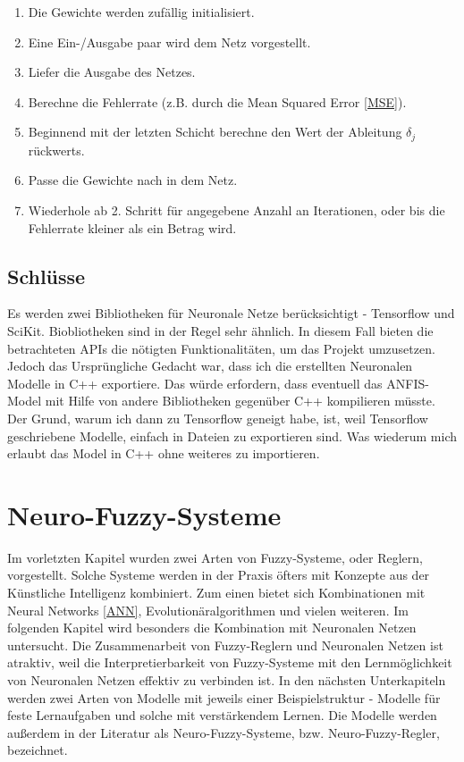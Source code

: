 \begin{enumerate}\label{BPA}
	\item Die Gewichte werden zufällig initialisiert.
	\item Eine Ein-/Ausgabe paar wird dem Netz vorgestellt.
	\item Liefer die Ausgabe des Netzes.
	\item Berechne die Fehlerrate (z.B. durch die Mean Squared Error \ref{MSE}).
	\item Beginnend mit der letzten Schicht berechne den Wert der Ableitung $\delta_j$ rückwerts.
	\item Passe die Gewichte nach in dem Netz.
	\item Wiederhole ab 2. Schritt für angegebene Anzahl an Iterationen, oder bis die Fehlerrate kleiner als ein Betrag wird.
\end{enumerate}


\subsection{Schlüsse}

Es werden zwei Bibliotheken für Neuronale Netze berücksichtigt - Tensorflow und SciKit. Biobliotheken sind in der Regel sehr ähnlich. In diesem Fall bieten die betrachteten APIs die nötigten Funktionalitäten, um das Projekt umzusetzen. Jedoch das Ursprüngliche Gedacht war, dass ich die erstellten Neuronalen Modelle in C++ exportiere. Das würde erfordern, dass eventuell das ANFIS-Model mit Hilfe von andere Bibliotheken gegenüber C++ kompilieren müsste. Der Grund, warum ich dann zu Tensorflow geneigt habe, ist, weil Tensorflow geschriebene Modelle, einfach in Dateien zu exportieren sind. Was wiederum mich erlaubt das Model in C++ ohne weiteres zu importieren.









\section{Neuro-Fuzzy-Systeme}

Im vorletzten Kapitel wurden zwei Arten von Fuzzy-Systeme, oder Reglern, vorgestellt. Solche Systeme werden in der Praxis öfters mit Konzepte aus der Künstliche Intelligenz kombiniert. Zum einen bietet sich Kombinationen mit Neural Networks \ref{ANN}, Evolutionäralgorithmen und vielen weiteren. Im folgenden Kapitel wird besonders die Kombination mit Neuronalen Netzen untersucht. Die Zusammenarbeit von Fuzzy-Reglern und Neuronalen Netzen ist atraktiv, weil die Interpretierbarkeit von Fuzzy-Systeme mit den Lernmöglichkeit von Neuronalen Netzen effektiv zu verbinden ist. In den nächsten Unterkapiteln werden zwei Arten von Modelle mit jeweils einer Beispielstruktur - Modelle für feste Lernaufgaben und solche mit verstärkendem Lernen. Die Modelle werden außerdem in der Literatur als Neuro-Fuzzy-Systeme, bzw. Neuro-Fuzzy-Regler, bezeichnet. \cite{CIKruse:15}
